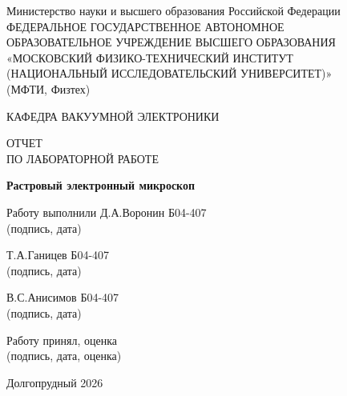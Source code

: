 \documentclass[12pt]{article}
\begin{document}
\thispagestyle{empty}

\begin{center}

\large
Министерство науки и высшего образования Российской Федерации \\
\large
ФЕДЕРАЛЬНОЕ ГОСУДАРСТВЕННОЕ АВТОНОМНОЕ \\
ОБРАЗОВАТЕЛЬНОЕ УЧРЕЖДЕНИЕ ВЫСШЕГО ОБРАЗОВАНИЯ \\
\large
«МОСКОВСКИЙ ФИЗИКО-ТЕХНИЧЕСКИЙ ИНСТИТУТ \\
(НАЦИОНАЛЬНЫЙ ИССЛЕДОВАТЕЛЬСКИЙ УНИВЕРСИТЕТ)» \\
(МФТИ, Физтех)

\vspace{3cm}

\large
КАФЕДРА ВАКУУМНОЙ ЭЛЕКТРОНИКИ

\vspace{0.7cm}

\Large
ОТЧЕТ \\
ПО ЛАБОРАТОРНОЙ РАБОТЕ

\vspace{0.7cm}

\Large
\textbf{Растровый электронный микроскоп}

\vfill

\vspace{1.5cm}

\large

\noindent
Работу выполнили \hfill \underline{\hspace{6cm}} Д.А.Воронин Б04-407 \\
\hfill {\small (подпись, дата)}\par %


\noindent
\hfill \underline{\hspace{6cm}} Т.А.Ганицев Б04-407 \\
\hfill {\small (подпись, дата)}\par %

\noindent
\hfill \underline{\hspace{6cm}} В.С.Анисимов Б04-407 \\
\hfill {\small (подпись, дата)}\par %


\vspace{3cm}

\noindent
Работу принял, оценка \hfill \underline{\hspace{6cm}} \\
\hfill {\small (подпись, дата, оценка)} %

\vfill

Долгопрудный 2026

\end{center}
\end{document}
